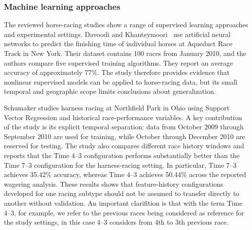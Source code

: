 \subsubsection*{\textbf{Machine learning approaches}} The reviewed horse-racing studies show a
range of supervised learning approaches and experimental settings. Davoodi and
Khanteymoori~\cite{ejeA_davoodi2010} use artificial neural networks to predict the
finishing time of individual horses at Aqueduct Race Track in New York. Their
dataset contains 100 races from January 2010, and the authors compare five
supervised training algorithms. They report an average accuracy of approximately
77\%. The study therefore provides evidence that nonlinear supervised models can be
applied to horse-racing data, but its small temporal and geographic scope limits
conclusions about generalization.

Schumaker\cite{ejeA_schumaker2018} studies harness racing at Northfield Park in
Ohio using Support Vector Regression and historical race-performance variables. A
key contribution of the study is its explicit temporal separation: data from
October 2009 through September 2010 are used for training, while October through
December 2010 are reserved for testing. The study also compares different race
history windows and reports that the Time 4--3 configuration performs substantially
better than the Time 7--3 configuration for the harness-racing setting. In
particular, Time 7--3 achieves 35.42\% accuracy, whereas Time 4--3 achieves 50.44\%
across the reported wagering analysis. These results shows that feature-history
configurations developed for one racing subtype should not be assumed to transfer
directly to another without validation. An important clarifition is that with the
term Time 4--3, for example, we refer to the previous races being considered as
reference for the study settings, in this case 4--3 considers from 4th to 3th
previous race.

